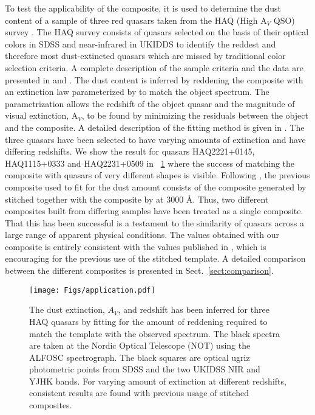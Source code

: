 \documentclass{aa}    %
\newcommand{\figref}[1]{\ref{fig:#1}}
\newcommand{\Fig}[1]{\figurename~\figref{#1}}
\newcommand{\fig}[1]{\Fig{#1}}
\newcommand{\figlabel}[1]{\label{fig:#1}}
\newcommand{\sectionname}{Sect.}
\newcommand{\Sect}[1]{\sectionname~\ref{sect:#1}}
\newcommand{\sect}[1]{\Sect{#1}}
\begin{document}
To test the applicability of the composite, it is used to determine the dust content of a sample of three red quasars taken from the HAQ (High A$_V$ QSO) survey \citep{Krogager2015}. The HAQ survey consists of quasars selected on the basis of their optical colors in SDSS and near-infrared in UKIDDS to identify the reddest and therefore most dust-extincted quasars which are missed by traditional color selection criteria. A complete description of the sample criteria and the data are presented in \citet{Fynbo2013} and \citet{Krogager2015}. The dust content is inferred by reddening the composite with an extinction law parameterized by \citet{Gordon2003} to match the object spectrum. The parametrization allows the redshift of the object quasar and the magnitude of visual extinction, A$_V$, to be found by minimizing the residuals between the object and the composite. A detailed description of the fitting method is given in \cite{Krogager2015}.
The three quasars have been selected to have varying amounts of extinction and have differing redshifts. We show the result for quasars HAQ2221+0145, HAQ1115+0333 and HAQ2231+0509 in \fig{application} where the success of matching the composite with quasars of very different shapes is visible. 
Following \cite{Wang2012}, the previous composite used to fit for the dust amount consists of the composite generated by \cite{VandenBerk2001} stitched together with the composite by \cite{Glikman2006} at 3000 \AA. Thus, two different composites built from differing samples have been treated as a single composite. That this has been successful is a testament to the similarity of quasars across a large range of apparent physical conditions. 
The values obtained with our composite is entirely consistent with the values published in \cite{Krogager2015}, which is encouraging for the previous use of the stitched template. A detailed comparison between the different composites is presented in \sect{comparison}.

\begin{figure}[t!]
 \centering
 \texttt{[image: Figs/application.pdf]}
 \caption[]{The dust extinction, $A_V$, and redshift has been inferred for three HAQ quasars by fitting for the amount of reddening required to match the template with the observed spectrum. The black spectra are taken at the Nordic Optical Telescope (NOT) using the ALFOSC spectrograph. The black squares are optical ugriz photometric points from SDSS and the two UKIDSS NIR and YJHK bands. For varying amount of extinction at different redshifts, consistent results are found with previous usage of stitched composites.}
 \figlabel{application}
\end{figure}
 
\end{document}
